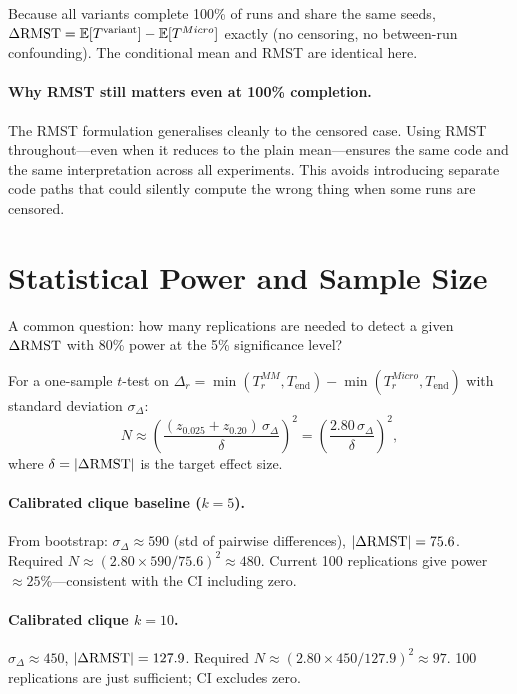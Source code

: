 \documentclass[11pt,a4paper]{article}
\begin{document}
Because all variants complete 100\% of runs and share the same seeds,
$\Delta\mathrm{RMST} = \mathbb{E}[T^{\mathrm{variant}}] - \mathbb{E}[T^{Micro}]$ exactly
(no censoring, no between-run confounding).  The conditional mean and RMST
are identical here.

\paragraph{Why RMST still matters even at 100\% completion.}
The RMST formulation generalises cleanly to the censored case.
Using RMST throughout---even when it reduces to the plain mean---ensures
the same code and the same interpretation across all experiments.
This avoids introducing separate code paths that could silently compute
the wrong thing when some runs are censored.

\section{Statistical Power and Sample Size}

A common question: how many replications are needed to detect a given
$\Delta\mathrm{RMST}$ with 80\% power at the 5\% significance level?

For a one-sample $t$-test on $\Delta_r = \min(T_r^{MM}, T_{\mathrm{end}}) -
\min(T_r^{Micro}, T_{\mathrm{end}})$ with standard deviation $\sigma_\Delta$:
\[
  N \approx \left(\frac{(z_{0.025} + z_{0.20})\, \sigma_\Delta}{\delta}\right)^2
           = \left(\frac{2.80\, \sigma_\Delta}{\delta}\right)^2,
\]
where $\delta = |\Delta\mathrm{RMST}|$ is the target effect size.

\paragraph{Calibrated clique baseline ($k=5$).}
From bootstrap: $\sigma_\Delta \approx 590$ (std of pairwise differences),
$|\Delta\mathrm{RMST}| = 75.6$.  Required $N \approx (2.80 \times 590 / 75.6)^2 \approx 480$.
Current 100 replications give power $\approx 25\%$---consistent with the CI
including zero.

\paragraph{Calibrated clique $k=10$.}
$\sigma_\Delta \approx 450$, $|\Delta\mathrm{RMST}| = 127.9$.
Required $N \approx (2.80 \times 450 / 127.9)^2 \approx 97$.
100 replications are just sufficient; CI excludes zero.
\end{document}
